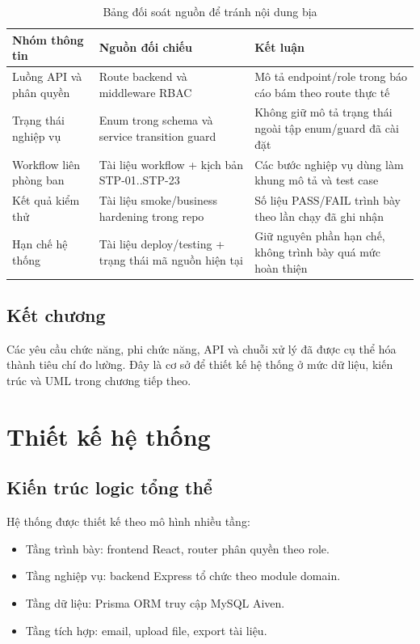 \documentclass[12pt,a4paper]{report}
\begin{document}
\begin{table}[H]
\centering
\small
\begin{tabular}{|L{3.1cm}|L{4.1cm}|L{5.2cm}|}
\hline
\textbf{Nhóm thông tin} & \textbf{Nguồn đối chiếu} & \textbf{Kết luận} \\ \hline
Luồng API và phân quyền & Route backend và middleware RBAC & Mô tả endpoint/role trong báo cáo bám theo route thực tế \\ \hline
Trạng thái nghiệp vụ & Enum trong schema và service transition guard & Không giữ mô tả trạng thái ngoài tập enum/guard đã cài đặt \\ \hline
Workflow liên phòng ban & Tài liệu workflow + kịch bản STP-01..STP-23 & Các bước nghiệp vụ dùng làm khung mô tả và test case \\ \hline
Kết quả kiểm thử & Tài liệu smoke/business hardening trong repo & Số liệu PASS/FAIL trình bày theo lần chạy đã ghi nhận \\ \hline
Hạn chế hệ thống & Tài liệu deploy/testing + trạng thái mã nguồn hiện tại & Giữ nguyên phần hạn chế, không trình bày quá mức hoàn thiện \\ \hline
\end{tabular}
\caption{Bảng đối soát nguồn để tránh nội dung bịa}
\end{table}

\section{Kết chương}
Các yêu cầu chức năng, phi chức năng, API và chuỗi xử lý đã được cụ thể hóa thành tiêu chí đo lường. Đây là cơ sở để thiết kế hệ thống ở mức dữ liệu, kiến trúc và UML trong chương tiếp theo.

\chapter{Thiết kế hệ thống}

\section{Kiến trúc logic tổng thể}
Hệ thống được thiết kế theo mô hình nhiều tầng:
\begin{itemize}[leftmargin=1.2cm]
\item Tầng trình bày: frontend React, router phân quyền theo role.
\item Tầng nghiệp vụ: backend Express tổ chức theo module domain.
\item Tầng dữ liệu: Prisma ORM truy cập MySQL Aiven.
\item Tầng tích hợp: email, upload file, export tài liệu.
\end{itemize}
\end{document}

